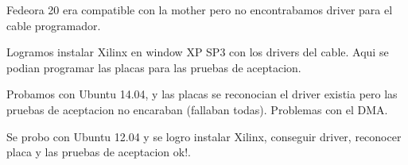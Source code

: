 Fedeora 20 era compatible con la mother pero no encontrabamos driver para el cable programador.

Logramos instalar Xilinx en window XP SP3 con los drivers del cable. Aqui se podian programar las placas para las pruebas de aceptacion.

Probamos con Ubuntu 14.04, y las placas se reconocian el driver existia pero las pruebas de aceptacion no encaraban (fallaban todas). Problemas con el DMA.

Se probo con Ubuntu 12.04 y se logro instalar Xilinx, conseguir driver, reconocer placa y las pruebas de aceptacion ok!. 
